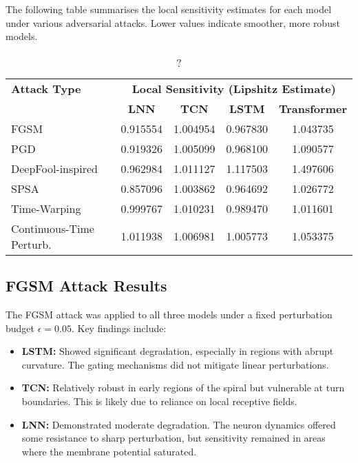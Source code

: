 The following table summarises the local sensitivity estimates for each model under various adversarial attacks. Lower values indicate smoother, more robust models.

\begin{table}[H]
    \centering
    \small
    \begin{tabular}{|l|cccc|}
    \hline
    \textbf{Attack Type} & \multicolumn{4}{c|}{\textbf{Local Sensitivity (Lipshitz Estimate)}} \\
    \cline{2-5}
     & \textbf{LNN} & \textbf{TCN} & \textbf{LSTM} & \textbf{Transformer} \\
    \hline
    FGSM                     & 0.915554 & 1.004954 & 0.967830 & 1.043735 \\
    PGD                      & 0.919326 & 1.005099 & 0.968100 & 1.090577 \\
    DeepFool-inspired        & 0.962984 & 1.011127 & 1.117503 & 1.497606 \\
    SPSA                     & 0.857096 & 1.003862 & 0.964692 & 1.026772 \\
    Time-Warping             & 0.999767 & 1.010231 & 0.989470 & 1.011601 \\
    Continuous-Time Perturb. & 1.011938 & 1.006981 & 1.005773 & 1.053375 \\
    \hline
    \end{tabular}
    \caption{?}
    \label{tab:attack_results_sensitivity}
\end{table}

\subsection*{FGSM Attack Results}

The FGSM attack was applied to all three models under a fixed perturbation budget $\epsilon = 0.05$. Key findings include:
\begin{itemize}
    \item \textbf{LSTM:} Showed significant degradation, especially in regions with abrupt curvature. The gating mechanisms did not mitigate linear perturbations.
    \item \textbf{TCN:} Relatively robust in early regions of the spiral but vulnerable at turn boundaries. This is likely due to reliance on local receptive fields.
    \item \textbf{LNN:} Demonstrated moderate degradation. The neuron dynamics offered some resistance to sharp perturbation, but sensitivity remained in areas where the membrane potential saturated.
\end{itemize}


